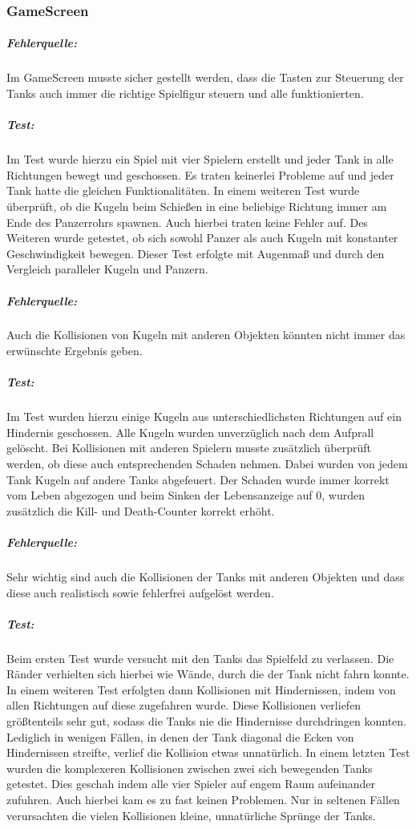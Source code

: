 \documentclass[a4paper]{scrreprt}
\begin{document}
\subsubsection*{GameScreen}
\subparagraph*{Fehlerquelle:}
Im GameScreen musste sicher gestellt werden, dass die Tasten zur Steuerung der Tanks auch immer die richtige Spielfigur steuern und alle funktionierten. 
\subparagraph*{Test:}
Im Test wurde hierzu ein Spiel mit vier Spielern erstellt und jeder Tank in alle Richtungen bewegt und geschossen. Es traten keinerlei Probleme auf und jeder Tank hatte die gleichen Funktionalitäten. In einem weiteren Test wurde überprüft, ob die Kugeln beim Schießen in eine beliebige Richtung immer am Ende des Panzerrohrs spawnen. Auch hierbei traten keine Fehler auf. Des Weiteren wurde getestet, ob sich sowohl Panzer als auch Kugeln mit konstanter Geschwindigkeit bewegen. Dieser Test erfolgte mit Augenmaß und durch den Vergleich paralleler Kugeln und Panzern.
		
\subparagraph*{Fehlerquelle:}
Auch die Kollisionen von Kugeln mit anderen Objekten könnten nicht immer das erwünschte Ergebnis geben. 
\subparagraph*{Test:}
Im Test wurden hierzu einige Kugeln aus unterschiedlichsten Richtungen auf ein Hindernis geschossen. Alle Kugeln wurden unverzüglich nach dem Aufprall gelöscht. Bei Kollisionen mit anderen Spielern musste zusätzlich überprüft werden, ob diese auch entsprechenden Schaden nehmen. Dabei wurden von jedem Tank Kugeln auf andere Tanks abgefeuert. Der Schaden wurde immer korrekt vom Leben abgezogen und beim Sinken der Lebensanzeige auf 0, wurden zusätzlich die Kill- und Death-Counter korrekt erhöht.
		
\subparagraph*{Fehlerquelle:}
Sehr wichtig sind auch die Kollisionen der Tanks mit anderen Objekten und dass diese auch realistisch sowie fehlerfrei aufgelöst werden. 
\subparagraph*{Test:}
Beim ersten Test wurde versucht mit den Tanks das Spielfeld zu verlassen. Die Ränder verhielten sich hierbei wie Wände, durch die der Tank nicht fahrn konnte. In einem weiteren Test erfolgten dann Kollisionen mit Hindernissen, indem von allen Richtungen auf diese zugefahren wurde. Diese Kollisionen verliefen größtenteils sehr gut, sodass die Tanks nie die Hindernisse durchdringen konnten. Lediglich in wenigen Fällen, in denen der Tank diagonal die Ecken von Hindernissen streifte, verlief die Kollision etwas unnatürlich. In einem letzten Test wurden die komplexeren Kollisionen zwischen zwei sich bewegenden Tanks getestet. Dies geschah indem alle vier Spieler auf engem Raum aufeinander zufuhren. Auch hierbei kam es zu fast keinen Problemen. Nur in seltenen Fällen verursachten die vielen Kollisionen kleine, unnatürliche Sprünge der Tanks.
		
\end{document}

